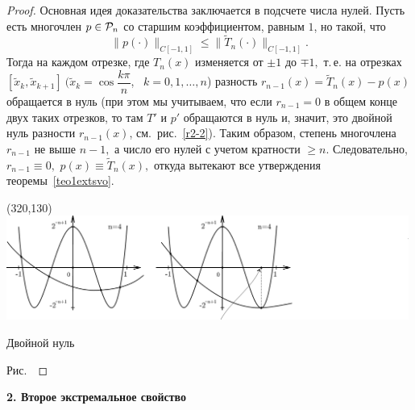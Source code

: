 \begin{proof}
Основная идея доказательства заключается в подсчете числа нулей. Пусть есть многочлен
$p \in \mathcal{P}_n$ %
{со старшим коэффициентом, равным $1$,}
но {такой, что}
$$
  \|p(\cdot )\|_{C[-1,1]}  \le \|\widetilde T_n(\cdot )\|_{C[-1,1]}.
$$
Тогда на каждом отрезке, где {$T_n(x)$} изменяется от {$\pm 1$} до {$\mp 1,$ т.\,е. на }
{отрезках $[\widetilde x_k, \widetilde
x_{k+1}]\ (\widetilde x_k=\cos \dfrac{k\pi}{n}$, \
$k={0,1,}\ldots,n$)} разность {$r_{n-1}(x)=\widetilde T_n(x)-p(x)$} обращается в нуль
{(при этом мы учитываем, что если $r_{n-1}=0$ в общем конце двух} {таких отрезков,
то там $T'$ и $p'$ обращаются в нуль и, значит, это
двойной нуль} {разности $r_{n-1}(x)$, см.~рис.~\ref{r2-2}).} {Таким образом,}
степень многочлена $r_{n-1}$ не выше $n-1,$ {а число его
нулей с учетом кратности $\ge n.$} {Следовательно,} $r_{n-1} \equiv 0,$ {$p(x)
\equiv \widetilde T_n(x),$ откуда вытекают все утверждения
теоремы~\ref{teo1extsvo}.} %

\begin{center}
\begin{picture}(320,130)
\includegraphics[width=0.99\textwidth]{pict02-2.eps}
\end{picture}

\label{r2-2}
\end{center}

 \hspace{9.5cm} {Двойной нуль}


 \centerline{\normalsize Рис.~\theris}
\end{proof}

\vspace{2mm}
{\bf 2. Второе экстремальное свойство}
\vspace{3mm}

